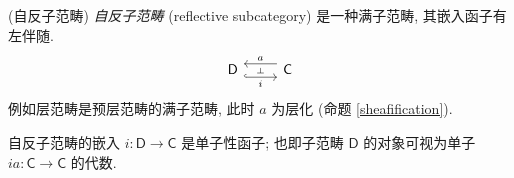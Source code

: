 \begin{example}
	{(自反子范畴)}
	\emph{自反子范畴} (reflective subcategory) 是一种满子范畴, 其嵌入函子有左伴随.
	\[\begin{tikzcd}[ampersand replacement=\&]
		{\mathsf D} \& {\mathsf C}
		\arrow[""{name=0, anchor=center, inner sep=0}, "i"', shift right=2, hook, from=1-1, to=1-2]
		\arrow[""{name=1, anchor=center, inner sep=0}, "a"', shift right=2, from=1-2, to=1-1]
		\arrow["\dashv"{anchor=center, rotate=-90}, draw=none, from=1, to=0]
	\end{tikzcd}\]
	例如层范畴是预层范畴的满子范畴, 此时 $a$ 为层化 (命题 \ref{sheafification}).
	
	自反子范畴的嵌入 $i\colon \mathsf D\to\mathsf C$ 是单子性函子; 也即子范畴 $\mathsf D$ 的对象可视为单子 $ia\colon \mathsf C\to\mathsf C$ 的代数.
\end{example}